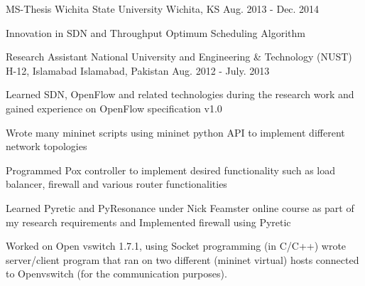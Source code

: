 

\begin{cventries}

  \cventry
    {MS-Thesis} %
    {Wichita State University} %
    {Wichita, KS} %
    {Aug. 2013 - Dec. 2014} %
    {
      \begin{cvitems} %
        \item {Innovation in SDN and Throughput Optimum Scheduling Algorithm}
      \end{cvitems}
    }

  \cventry
    {Research Assistant} %
    {National University and Engineering \& Technology (NUST) H-12, Islamabad} %
    {Islamabad, Pakistan} %
    {Aug. 2012 - July. 2013} %
    {
      \begin{cvitems} %
        \item {Learned SDN, OpenFlow and related technologies during the research work and
        		gained experience on OpenFlow specification v1.0}
        \item {Wrote many mininet scripts using mininet python API to implement different network topologies}
        \item {Programmed Pox controller to implement desired functionality such as load balancer, firewall
        		and various router functionalities}
        \item {Learned Pyretic and PyResonance under Nick Feamster online course as part of my research requirements
        		and Implemented firewall using Pyretic}
        \item {Worked on Open vswitch 1.7.1, using Socket programming (in C/C++) wrote server/client program that ran
        		on two different (mininet virtual) hosts connected to Openvswitch (for the communication purposes).}
      \end{cvitems}
    }


\end{cventries}
